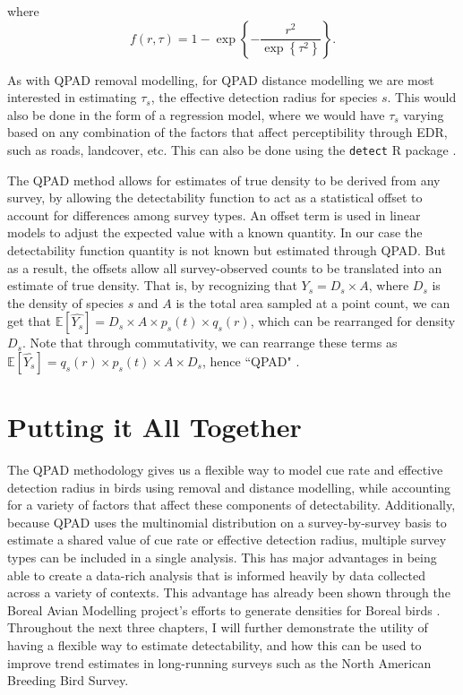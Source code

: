 where 
$$f(r,\tau) =  1 - \exp\left\{ -\dfrac{r^2}{\exp\left\{\tau^2\right\}} \right\}.$$

\par As with QPAD removal modelling, for QPAD distance modelling we are most interested in estimating $\tau_s$, the effective detection radius for species $s$. 
This would also be done in the form of a regression model, where we would have $\tau_s$ varying based on any combination of the factors that affect perceptibility through EDR, such as roads, landcover, etc.
This can also be done using the \texttt{detect} R package \citep{solymos_detect_2020}.

\par The QPAD method allows for estimates of true density to be derived from any survey, by allowing the detectability function to act as a statistical offset to account for differences among survey types. An offset term is used in linear models to adjust the expected value with a known quantity. In our case the detectability function quantity is not known but estimated through QPAD. But as a result, the offsets allow all survey-observed counts to be translated into an estimate of true density. That is, by recognizing that $Y_s = D_s \times A$, where $D_s$ is the density of species $s$ and $A$ is the total area sampled at a point count, we can get that $\mathbb{E}\left[\hat{Y_s}\right] = D_s \times A \times p_s(t) \times q_s(r)$, which can be rearranged for density $D_s$. Note that through commutativity, we can rearrange these terms as $\mathbb{E}\left[\hat{Y_s}\right] = q_s(r) \times p_s(t) \times A \times D_s$, hence ``QPAD" \citep{solymos_calibrating_2013}.

\section{Putting it All Together}
\par The QPAD methodology gives us a flexible way to model cue rate and effective detection radius in birds using removal and distance modelling, while accounting for a variety of factors that affect these components of detectability.
Additionally, because QPAD uses the multinomial distribution on a survey-by-survey basis to estimate a shared value of cue rate or effective detection radius, multiple survey types can be included in a single analysis.
This has major advantages in being able to create a data-rich analysis that is informed heavily by data collected across a variety of contexts.
This advantage has already been shown through the Boreal Avian Modelling project's efforts to generate densities for Boreal birds \citep{solymos_calibrating_2013, solymos_evaluating_2018, solymos_phylogeny_2018, solymos_lessons_2020}.
Throughout the next three chapters, I will further demonstrate the utility of having a flexible way to estimate detectability, and how this can be used to improve trend estimates in long-running surveys such as the North American Breeding Bird Survey.



